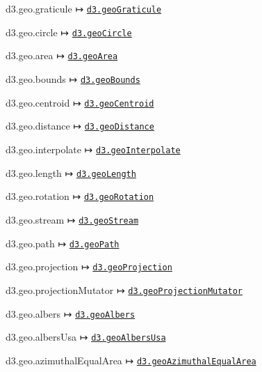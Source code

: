 \begin{DoxyItemize}
\item d3.\+geo.\+graticule ↦ \href{https://github.com/d3/d3-geo/blob/master/README.md#geoGraticule}{\tt d3.\+geo\+Graticule}
\item d3.\+geo.\+circle ↦ \href{https://github.com/d3/d3-geo/blob/master/README.md#geoCircle}{\tt d3.\+geo\+Circle}
\item d3.\+geo.\+area ↦ \href{https://github.com/d3/d3-geo/blob/master/README.md#geoArea}{\tt d3.\+geo\+Area}
\item d3.\+geo.\+bounds ↦ \href{https://github.com/d3/d3-geo/blob/master/README.md#geoBounds}{\tt d3.\+geo\+Bounds}
\item d3.\+geo.\+centroid ↦ \href{https://github.com/d3/d3-geo/blob/master/README.md#geoCentroid}{\tt d3.\+geo\+Centroid}
\item d3.\+geo.\+distance ↦ \href{https://github.com/d3/d3-geo/blob/master/README.md#geoDistance}{\tt d3.\+geo\+Distance}
\item d3.\+geo.\+interpolate ↦ \href{https://github.com/d3/d3-geo/blob/master/README.md#geoInterpolate}{\tt d3.\+geo\+Interpolate}
\item d3.\+geo.\+length ↦ \href{https://github.com/d3/d3-geo/blob/master/README.md#geoLength}{\tt d3.\+geo\+Length}
\item d3.\+geo.\+rotation ↦ \href{https://github.com/d3/d3-geo/blob/master/README.md#geoRotation}{\tt d3.\+geo\+Rotation}
\item d3.\+geo.\+stream ↦ \href{https://github.com/d3/d3-geo/blob/master/README.md#geoStream}{\tt d3.\+geo\+Stream}
\item d3.\+geo.\+path ↦ \href{https://github.com/d3/d3-geo/blob/master/README.md#geoPath}{\tt d3.\+geo\+Path}
\item d3.\+geo.\+projection ↦ \href{https://github.com/d3/d3-geo/blob/master/README.md#geoProjection}{\tt d3.\+geo\+Projection}
\item d3.\+geo.\+projection\+Mutator ↦ \href{https://github.com/d3/d3-geo/blob/master/README.md#geoProjectionMutator}{\tt d3.\+geo\+Projection\+Mutator}
\item d3.\+geo.\+albers ↦ \href{https://github.com/d3/d3-geo/blob/master/README.md#geoAlbers}{\tt d3.\+geo\+Albers}
\item d3.\+geo.\+albers\+Usa ↦ \href{https://github.com/d3/d3-geo/blob/master/README.md#geoAlbersUsa}{\tt d3.\+geo\+Albers\+Usa}
\item d3.\+geo.\+azimuthal\+Equal\+Area ↦ \href{https://github.com/d3/d3-geo/blob/master/README.md#geoAzimuthalEqualArea}{\tt d3.\+geo\+Azimuthal\+Equal\+Area}

\end{DoxyItemize}
